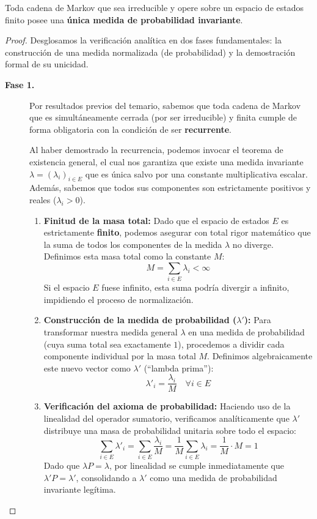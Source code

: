 \documentclass[10pt]{book}
\newcommand{\tbf}{\textbf}
\begin{document}
\begin{coro}
    Toda cadena de Markov que sea irreducible y opere sobre un espacio de estados finito posee una \textbf{única medida de probabilidad invariante}.
\begin{proof}
    Desglosamos la verificación analítica en dos fases fundamentales: la construcción de una medida normalizada (de probabilidad) y la demostración formal de su unicidad.
    \begin{description}
        \item[\tbf{Fase 1.}] Por resultados previos del temario, sabemos que toda cadena de Markov que es simultáneamente cerrada (por ser irreducible) y finita cumple de forma obligatoria con la condición de ser \textbf{recurrente}.

    Al haber demostrado la recurrencia, podemos invocar el teorema de existencia general, el cual nos garantiza que existe una medida invariante $\lambda = (\lambda_i)_{i \in E}$ que es única salvo por una constante multiplicativa escalar. Además, sabemos que todos sus componentes son estrictamente positivos y reales ($\lambda_i > 0$).

    \begin{enumerate}
        \item \textbf{Finitud de la masa total:} 
        Dado que el espacio de estados $E$ es estrictamente \textbf{finito}, podemos asegurar con total rigor matemático que la suma de todos los componentes de la medida $\lambda$ no diverge. Definimos esta masa total como la constante $M$:
        \[
        M = \sum_{i \in E} \lambda_i < \infty
        \]
        Si el espacio $E$ fuese infinito, esta suma podría divergir a infinito, impidiendo el proceso de normalización.
        
        \item \textbf{Construcción de la medida de probabilidad ($\lambda'$):}
        Para transformar nuestra medida general $\lambda$ en una medida de probabilidad (cuya suma total sea exactamente $1$), procedemos a dividir cada componente individual por la masa total $M$. Definimos algebraicamente este nuevo vector como $\lambda'$ (``lambda prima''):
        \[
        \lambda'_i = \frac{\lambda_i}{M} \quad \forall i \in E
        \]
        
        \item \textbf{Verificación del axioma de probabilidad:}
        Haciendo uso de la linealidad del operador sumatorio, verificamos analíticamente que $\lambda'$ distribuye una masa de probabilidad unitaria sobre todo el espacio:
        \[
        \sum_{i \in E} \lambda'_i = \sum_{i \in E} \frac{\lambda_i}{M} = \frac{1}{M} \sum_{i \in E} \lambda_i = \frac{1}{M} \cdot M = 1
        \]
        Dado que $\lambda P = \lambda$, por linealidad se cumple inmediatamente que $\lambda' P = \lambda'$, consolidando a $\lambda'$ como una medida de probabilidad invariante legítima.
    \end{enumerate}


\end{description}
\end{proof}
\end{coro}
\end{document}
